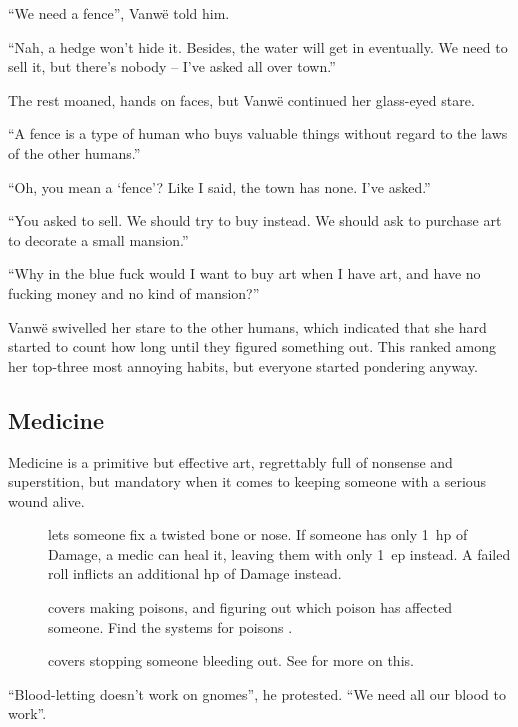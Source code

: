 \begin{multicols}{2}
\begin{exampletext}
  ``We need a fence'', Vanw\"e told him.

  ``Nah, a hedge won't hide it.
  Besides, the water will get in eventually.
  We need to sell it, but there's nobody -- I've asked all over town.''

  The rest moaned, hands on faces, but Vanw\"e continued her glass-eyed stare.

  ``A fence is a type of human who buys valuable things without regard to the laws of the other humans.''

  ``Oh, you mean a `fence'?
  Like I said, the town has none.
  I've asked.''

  ``You asked to sell.
  We should try to buy instead.
  We should ask to purchase art to decorate a small mansion.''

  ``Why in the blue fuck would I want to buy art when I have art, and have no fucking money and no kind of mansion?''

  Vanw\"e swivelled her stare to the other humans, which indicated that she hard started to count how long until they figured something out.
  This ranked among her top-three most annoying habits, but everyone started pondering anyway.
\end{exampletext}

\subsection{Medicine}

Medicine is a primitive but effective art, regrettably full of nonsense and superstition, but mandatory when it comes to keeping someone with a serious wound alive.

\begin{description}
  \item[]
    lets someone fix a twisted bone or nose.
    If someone has only 1~\gls{hp} of Damage, a medic can heal it, leaving them with only 1~\gls{ep} instead.
    A failed roll inflicts an additional \gls{hp} of Damage instead.
  \item[]
    covers making poisons, and figuring out which poison has affected someone.
    Find the systems for poisons .
  \item[]
    covers stopping someone bleeding out.
    See  for more on this.
\end{description}

\begin{exampletext}
  ``Blood-letting doesn't work on gnomes'', he protested.
  ``We need all our blood to work''.


\end{exampletext}
\end{multicols}
